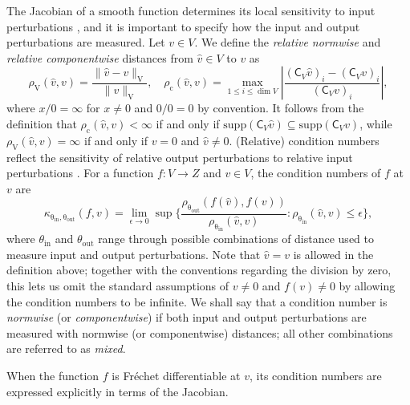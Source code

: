 \documentclass[namedate,webpdf,imanum]{ima-authoring-template}
\newcommand{\Norm}[3][]{#1\| #2 #1\|_{\mathrm{#3}}}
\newcommand{\Layer}[1]{\mathsf{#1}}
\newcommand{\dist}[3][]{\rho_{\mathrm{#2}} #1( #3 #1)}
\newcommand{\cond}[3][]{\kappa_{\mathrm{#2}} #1( #3 #1)}
\newcommand{\set}[3][]{#1\{ #2 : #3 #1\}}
\newcommand{\supp}[2][]{\mathrm{supp}#1( #2 #1)}
\numberwithin{equation}{section}
\begin{document}
The Jacobian of a smooth function determines its local sensitivity to input perturbations \citep{rice1966theory}, and it is important to specify how the input and output perturbations are measured.
Let $v \in V$.
We define the \emph{relative normwise} and \emph{relative componentwise} distances from $\hat{v} \in V$ to $v$ as
\begin{equation*}
    \dist{V}{\hat{v}, v} = \frac{\Norm{\hat{v} - v}{V}}{\Norm{v}{V}}, \quad \dist{c}{\hat{v}, v} = \max_{1 \leq i \leq \dim V} \left| \frac{(\Layer{C}_V \hat{v})_i - (\Layer{C}_V v)_i}{(\Layer{C}_V v)_i} \right|,
\end{equation*}
where $x / 0 = \infty$ for $x \neq 0$ and $0 / 0 = 0$ by convention.
It follows from the definition that $\dist{c}{\hat{v}, v} < \infty$ if and only if $\supp{\Layer{C}_V \hat{v}} \subseteq \supp{\Layer{C}_V v}$, while $\dist{V}{\hat{v}, v} = \infty$ if and only if $v = 0$ and $\hat{v} \neq 0$.
(Relative) condition numbers reflect the sensitivity of relative output perturbations to relative input perturbations \citep{gohberg1993mixed}.
For a function $f : V \to Z$ and $v \in V$, the condition numbers of $f$ at $v$ are
\begin{equation*}
    \cond{\theta_{in},\theta_{out}}{f,v} = \lim_{\epsilon \to 0} \sup \set[\Bigg]{\frac{\dist{\theta_{out}}{f(\hat{v}), f(v)}}{\dist{\theta_{in}}{\hat{v}, v}}}{\dist{\theta_{in}}{\hat{v}, v} \leq \epsilon},
\end{equation*}
where $\theta_{\mathrm{in}}$ and $\theta_{\mathrm{out}}$ range through possible combinations of distance used to measure input and output perturbations.
Note that $\hat{v} = v$ is allowed in the definition above; together with the conventions regarding the division by zero, this lets us omit the standard assumptions of $v \neq 0$ and $f(v) \neq 0$ by allowing the condition numbers to be infinite.
We shall say that a condition number is \emph{normwise} (or \emph{componentwise}) if both input and output perturbations are measured with normwise (or componentwise) distances; all other combinations are referred to as \emph{mixed}.

When the function $f$ is Fr\'echet differentiable at $v$, its condition numbers are expressed explicitly in terms of the Jacobian.
\end{document}

